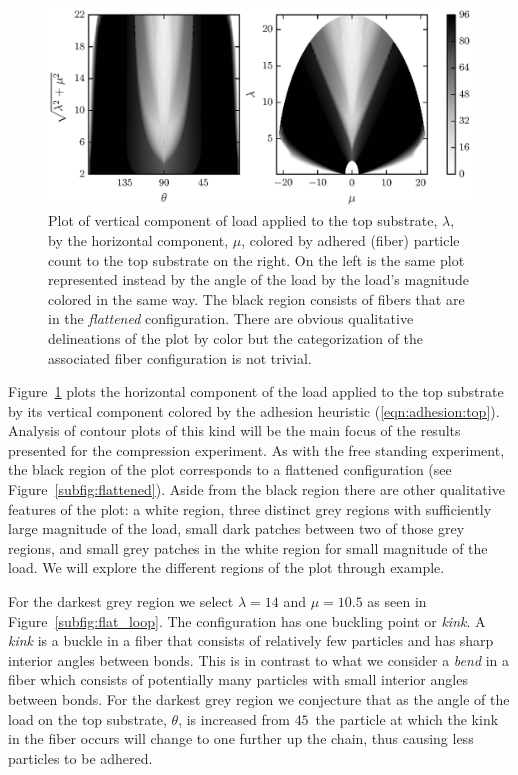 {	\begin{figure}[t]
		\begin{center}
			\includegraphics{./fig/ch3/push/ref/grid.eps}
		\end{center}		
		\caption{Plot of vertical component of load applied to the top substrate, $\lambda$, by the horizontal component, $\mu$, colored by adhered (fiber) particle count to the top substrate on the right. On the left is the same plot represented instead by the angle of the load by the load's magnitude colored in the same way. The black region consists of fibers that are in the \textit{flattened} configuration. There are obvious qualitative delineations of the plot by color but the categorization of the associated fiber configuration is not trivial.
		\label{fig:push:ref}}
	\end{figure}

Figure~\ref{fig:push:ref} plots the horizontal component of the load applied to the top substrate by its vertical component colored by the adhesion heuristic (\ref{eqn:adhesion:top}). Analysis of contour plots of this kind will be the main focus of the results presented for the compression experiment. As with the free standing experiment, the black region of the plot corresponds to a flattened configuration (see Figure~\ref{subfig:flattened}). Aside from the black region there are other qualitative features of the plot: a white region, three distinct grey regions with sufficiently large magnitude of the load, small dark patches between two of those grey regions, and small grey patches in the white region for small magnitude of the load. We will explore the different regions of the plot through example.

For the darkest grey region we select $\lambda=14$ and $\mu=10.5$ as seen in Figure~\ref{subfig:flat_loop}. The configuration has one buckling point or \textit{kink}. A \textit{kink} is a buckle in a fiber that consists of relatively few particles and has sharp interior angles between bonds. This is in contrast to what we consider a \textit{bend} in a fiber which consists of potentially many particles with small interior angles between bonds. For the darkest grey region we conjecture that as the angle of the load on the top substrate, $\theta$, is increased from $45$\textdegree\ the particle at which the kink in the fiber occurs will change to one further up the chain, thus causing less particles to be adhered.

}
